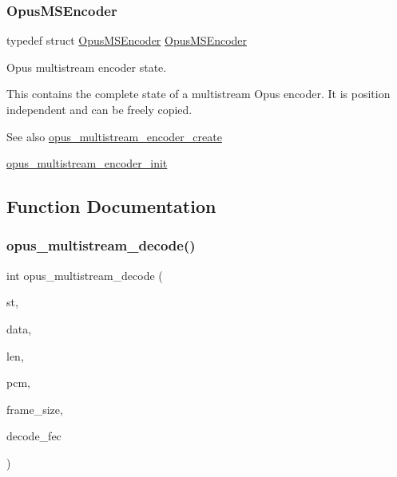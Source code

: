 \subsubsection{\texorpdfstring{Opus\+M\+S\+Encoder}{OpusMSEncoder}}
{\footnotesize\ttfamily typedef struct \hyperlink{group__opus__multistream_gae5826674d142fc873ebc1d781c507dd7}{Opus\+M\+S\+Encoder} \hyperlink{group__opus__multistream_gae5826674d142fc873ebc1d781c507dd7}{Opus\+M\+S\+Encoder}}



Opus multistream encoder state. 

This contains the complete state of a multistream Opus encoder. It is position independent and can be freely copied. \begin{DoxySeeAlso}{See also}
\hyperlink{group__opus__multistream_gaeb64c648ed8155f824ca8d9a93ccecae}{opus\+\_\+multistream\+\_\+encoder\+\_\+create} 

\hyperlink{group__opus__multistream_gae7586aa54c322fd9599de24b5c8b8c01}{opus\+\_\+multistream\+\_\+encoder\+\_\+init} 
\end{DoxySeeAlso}


\subsection{Function Documentation}
\mbox{\label{group__opus__multistream_gaa4b89541efe01970cf52e4a336db3ad0}} 
\subsubsection{\texorpdfstring{opus\+\_\+multistream\+\_\+decode()}{opus\_multistream\_decode()}}
{\footnotesize\ttfamily int opus\+\_\+multistream\+\_\+decode (\begin{DoxyParamCaption}\item[{\hyperlink{group__opus__multistream_gad3497495deb9a8ace82e76cd4f93e0e4}{Opus\+M\+S\+Decoder} $\ast$}]{st,  }\item[{const unsigned char $\ast$}]{data,  }\item[{\hyperlink{opus__types_8h_aa4d309d6f80b99dbabebc8f98879ab9a}{opus\+\_\+int32}}]{len,  }\item[{\hyperlink{opus__types_8h_acc9ed7cf60479eb81f9648c6ec27dc26}{opus\+\_\+int16} $\ast$}]{pcm,  }\item[{int}]{frame\+\_\+size,  }\item[{int}]{decode\+\_\+fec }\end{DoxyParamCaption})}



